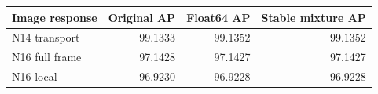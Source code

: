 \begin{tabular}{lrrr}\toprule
Image response & Original AP & Float64 AP & Stable mixture AP \\\midrule
N14 transport & 99.1333 & 99.1352 & 99.1352 \\
N16 full frame & 97.1428 & 97.1427 & 97.1427 \\
N16 local & 96.9230 & 96.9228 & 96.9228 \\
\bottomrule\end{tabular}
